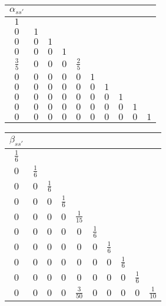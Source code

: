 \begin{table}[t]
\begin{subtable}{\linewidth}
\begin{tabular}{cccccccccc}
$\alpha_{ss'}$ & & & & & & & & & \\
\hline
$1$ & & & & & & & & &  \\
$0$ & $1$ & & & & & & & &  \\
$0$ & $0$ & $1$ & & & & & & &  \\
$0$ & $0$ & $0$ & $1$ & & & & & &  \\
$\frac{3}{5}$ & $0$ & $0$ & $0$ & $\frac{2}{5}$ & & & & &  \\
$0$ & $0$ & $0$ & $0$ & $0$ & $1$ & & & &  \\
$0$ & $0$ & $0$ & $0$ & $0$ & $0$ & $1$ & & &  \\
$0$ & $0$ & $0$ & $0$ & $0$ & $0$ & $0$ & $1$ & &  \\
$0$ & $0$ & $0$ & $0$ & $0$ & $0$ & $0$ & $0$ & $1$ &  \\
$0$ & $0$ & $0$ & $0$ & $0$ & $0$ & $0$ & $0$ & $0$ & $1$ \\
\hline
\end{tabular}
\hspace{.5cm}
\begin{tabular}{cccccccccc}
$\beta_{ss'}$ & & & & & & & & & \\
\hline
$\frac{1}{6}$ & & & & & & & & &  \\
$0$ & $\frac{1}{6}$ & & & & & & & &  \\
$0$ & $0$ & $\frac{1}{6}$ & & & & & & &  \\
$0$ & $0$ & $0$ & $\frac{1}{6}$ & & & & & &  \\
$0$ & $0$ & $0$ & $0$ & $\frac{1}{15}$ & & & & &  \\
$0$ & $0$ & $0$ & $0$ & $0$ & $\frac{1}{6}$ & & & &  \\
$0$ & $0$ & $0$ & $0$ & $0$ & $0$ & $\frac{1}{6}$ & & &  \\
$0$ & $0$ & $0$ & $0$ & $0$ & $0$ & $0$ & $\frac{1}{6}$ & &  \\
$0$ & $0$ & $0$ & $0$ & $0$ & $0$ & $0$ & $0$ & $\frac{1}{6}$ &  \\
$0$ & $0$ & $0$ & $0$ & $\frac{3}{50}$ & $0$ & $0$ & $0$ & $0$ & $\frac{1}{10}$ \\
\hline
\end{tabular}
\label{tb:ShuOsher_tbl_EXRK_SSPo3s4}
\end{subtable}
\end{table}

